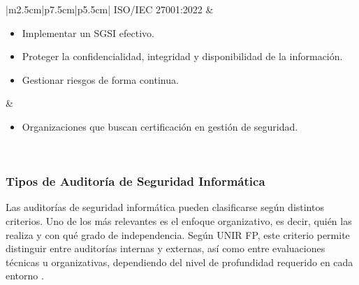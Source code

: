 \documentclass[a4paper, 11pt]{article}
\begin{document}
\begin{table}[H]
\begin{tabular}{|m{2.5cm}|p{7.5cm}|p{5.5cm}|}
ISO/IEC 27001:2022 &
\begin{minipage}[c]{\linewidth}
\begin{itemize} \par\vspace{0.1cm}
  \item Implementar un SGSI efectivo.    
  \item Proteger la confidencialidad, integridad y disponibilidad de la información.
  \item Gestionar riesgos de forma continua.    \par\vspace{0.1cm}

\end{itemize}
\end{minipage} &
\begin{minipage}[c]{\linewidth}
\begin{itemize}
  \item Organizaciones que buscan certificación en gestión de seguridad.
\end{itemize}
\end{minipage} \\ \hline

\end{tabular}
\caption{Comparativa de normativas y estándares en ciberseguridad.}
\label{tabla:normativas}
\end{table}



\subsubsection{Tipos de Auditoría de Seguridad Informática}

Las auditorías de seguridad informática pueden clasificarse según distintos criterios. Uno de los más relevantes es el enfoque organizativo, es decir, quién las realiza y con qué grado de independencia. Según UNIR FP, este criterio permite distinguir entre auditorías internas y externas, así como entre evaluaciones técnicas u organizativas, dependiendo del nivel de profundidad requerido en cada entorno \cite{unir}.
\end{document}
